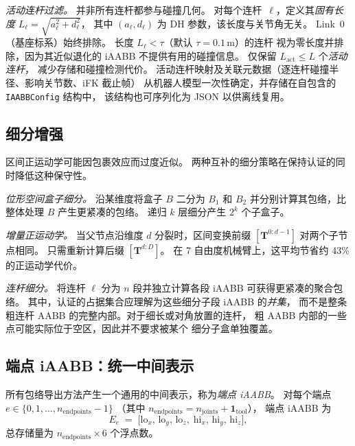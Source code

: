\documentclass[journal]{IEEEtran}
\newcommand{\bT}{\mathbf{T}}
\begin{document}
\emph{活动连杆过滤。}
并非所有连杆都参与碰撞几何。
对每个连杆~$\ell$，定义其\emph{固有长度}
$L_\ell = \sqrt{a_\ell^2 + d_\ell^2}$，
其中 $(a_\ell, d_\ell)$ 为 DH 参数，该长度与关节角无关。
Link~0（基座标系）始终排除。
长度 $L_\ell < \tau$（默认 $\tau = 0.1\,\text{m}$）的连杆
视为零长度并排除，因为其近似退化的 iAABB
不提供有用的碰撞信息。
仅保留 $L_\text{act} \leq L$ 个\emph{活动连杆}，
减少存储和碰撞检测代价。
活动连杆映射及关联元数据（逐连杆碰撞半径、影响关节数、iFK 截止帧）
从机器人模型一次性确定，并存储在自包含的 \texttt{IAABBConfig} 结构中，
该结构也可序列化为 JSON 以供离线复用。

\subsection{细分增强}\label{sec:subdivision}

区间正运动学可能因包裹效应而过度近似。
两种互补的细分策略在保持认证的同时降低这种保守性。

\emph{位形空间盒子细分。}
沿某维度将盒子 $B$ 二分为 $B_1$ 和 $B_2$
并分别计算其包络，比整体处理 $B$ 产生更紧凑的包络。
递归 $k$ 层细分产生 $2^k$ 个子盒子。

\emph{增量正运动学。}
当父节点沿维度 $d$ 分裂时，区间变换前缀
$[\bT^{0:d-1}]$ 对两个子节点相同。
只需重新计算后缀 $[\bT^{d:D}]$。
在 7 自由度机械臂上，这平均节省约 43\% 的正运动学代价。

\emph{连杆细分。}
将连杆 $\ell$ 分为 $n$ 段并独立计算各段 iAABB
可获得更紧凑的聚合包络。
其中，认证的占据集合应理解为这些细分子段 iAABB 的\emph{并集}，
而不是整条粗连杆 AABB 的完整内部。对于细长或对角放置的连杆，
粗 AABB 内部的一些点可能实际位于空区，因此并不要求被某个
细分子盒单独覆盖。

\subsection{端点 iAABB：统一中间表示}\label{sec:endpoint_iaabb}

所有包络导出方法产生一个通用的中间表示，称为\emph{端点 iAABB}。
对每个端点 $e \in \{0,1,\ldots,n_\text{endpoints}-1\}$
（其中 $n_\text{endpoints} = n_\text{joints} + \mathbf{1}_\text{tool}$），
端点 iAABB 为
\begin{equation}\label{eq:ep_iaabb}
  E_{e} \;=\;
  \bigl[\mathrm{lo}_x,\,\mathrm{lo}_y,\,\mathrm{lo}_z,\;
        \mathrm{hi}_x,\,\mathrm{hi}_y,\,\mathrm{hi}_z\bigr],
\end{equation}
总存储量为 $n_\text{endpoints} \times 6$ 个浮点数。
\end{document}
